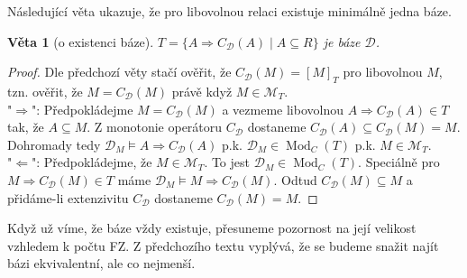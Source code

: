 \documentclass{article}
\newtheorem{theorem}{Věta}
\DeclareMathOperator{\Mod}{Mod}
\begin{document}
Následující věta ukazuje, že pro libovolnou relaci existuje minimálně
jedna báze.

\begin{theorem}[o existenci báze]
  $T = \{A \Rightarrow C_{\mathcal{D}}(A) \mid A \subseteq R\}$ je
  báze $\mathcal{D}$.
\end{theorem}

\begin{proof}
  Dle předchozí věty stačí ověřit, že $C_{\mathcal{D}}(M) = [M]_T$ pro
  libovolnou $M$, tzn. ověřit, že $M = C_{\mathcal{D}}(M)$ právě když
  $M \in \mathcal{M}_T$.\\

  "$\Rightarrow$": Předpokládejme $M = C_{\mathcal{D}}(M)$ a vezmeme
  libovolnou $A \Rightarrow C_{\mathcal{D}}(A) \in T$ tak, že $A
  \subseteq M$. Z monotonie operátoru $C_{\mathcal{D}}$ dostaneme
  $C_{\mathcal{D}}(A) \subseteq C_{\mathcal{D}}(M) = M$. Dohromady
  tedy $\mathcal{D}_M \models A \Rightarrow C_{\mathcal{D}}(A)$
  p.k. $\mathcal{D}_M \in \Mod_C(T)$ p.k. $M \in \mathcal{M}_T$.\\

  "$\Leftarrow$": Předpokládejme, že $M \in \mathcal{M}_T$. To jest
  $\mathcal{D}_M \in \Mod_C(T)$. Speciálně pro $M \Rightarrow
  C_{\mathcal{D}}(M) \in T$ máme $\mathcal{D}_M \models M \Rightarrow
  C_{\mathcal{D}}(M)$. Odtud $C_{\mathcal{D}}(M) \subseteq M$ a
  přidáme-li extenzivitu $C_{\mathcal{D}}$ dostaneme
  $C_{\mathcal{D}}(M) = M$.
\end{proof}

Když už víme, že báze vždy existuje, přesuneme pozornost na její
velikost vzhledem k počtu FZ. Z předchozího textu vyplývá, že se
budeme snažit najít bázi ekvivalentní, ale co nejmenší.
\end{document}
